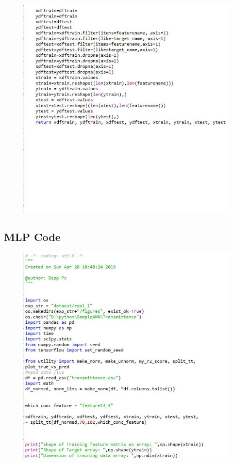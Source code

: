 \documentclass[]{article}
\begin{document}
\begin{figure}
\centering
\includegraphics[width=1\textwidth,height=\textheight]{images/utilityflann4.jpg}
\end{figure}

\hypertarget{mlp-code}{%
\subsection{MLP Code}\label{mlp-code}}


\begin{figure}
\centering
\includegraphics[width=1\textwidth,height=\textheight]{images/mlp1.jpg}
\end{figure}
\end{document}
